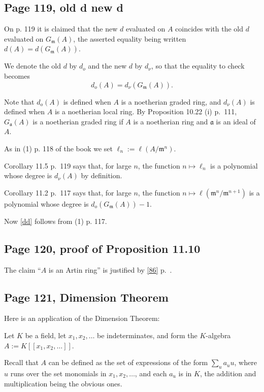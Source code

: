 \documentclass[parskip=half,fontsize=12pt]{scrartcl}%
\newcommand{\mf}{\mathfrak}
\newcommand{\aaa}{\mf a}
\newcommand{\mmm}{\mf m}
\begin{document}
\subsection{Page 119, old d new d}\label{odnd}%

On p. 119 it is claimed that the new $d$ evaluated on $A$ coincides with the old $d$ evaluated on $G_\mmm(A)$, the asserted equality being written $d(A)=d(G_\mmm(A))$. 

We denote the old $d$ by $d_o$ and the new $d$ by $d_\nu$, so that the equality to check becomes 
\begin{equation}\label{dd}
d_o(A)=d_\nu(G_\mmm(A)).
\end{equation}

Note that $d_o(A)$ is defined when $A$ is a noetherian graded ring, and $d_\nu(A)$ is defined when $A$ is a noetherian local ring. By Proposition 10.22 (i) p.~111, $G_\aaa(A)$ is a noetherian graded ring if $A$ is a noetherian ring and $\aaa$ is an ideal of $A$.

As in (1) p. 118 of the book we set $\ell_n:=\ell(A/\mmm^n)$. 

Corollary 11.5 p.~119 says that, for large $n$, the function $n\mapsto\ell_n$ is a polynomial whose degree is $d_\nu(A)$ by definition. 

Corollary 11.2 p.~117 says that, for large $n$, the function $n\mapsto\ell(\mmm^n/\mmm^{n+1})$ is a polynomial whose degree is $d_o(G_\mmm(A))-1$.

Now \eqref{dd} follows from (1) p. 117.

\subsection{Page 120, proof of Proposition 11.10}%

The claim ``$A$ is an Artin ring'' is justified by \eqref{86} p.~\pageref{86}.

\subsection{Page 121, Dimension Theorem}\label{dt}%

Here is an application of the Dimension Theorem: 

Let $K$ be a field, let $x_1,x_2,\dots$ be indeterminates, and form the $K$-algebra  $A:=K[[x_1,x_2,\dots]]$. 

Recall that $A$ can be defined as the set of expressions of the form $\sum_ua_uu$, where $u$ runs over the set monomials in $x_1,x_2,\dots$, and each $a_u$ is in $K$, the addition and multiplication being the obvious ones. 
\end{document}
